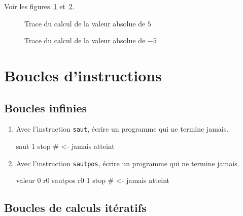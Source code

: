 \begin{correction}
Voir les figures~\ref{fig:abspos} et~\ref{fig:absposmoins}.
  \begin{figure}[tbp]
    \centering
    
    \caption{Trace du calcul de la valeur absolue de $5$}
    \label{fig:abspos}
  \end{figure}
  \begin{figure}[tbp]
    \centering
    
    \caption{Trace du calcul de la valeur absolue de $-5$}
    \label{fig:absposmoins}
  \end{figure}
\clearpage
\end{correction}

\section{Boucles d'instructions}

\subsection{Boucles infinies}

\begin{enumerate}
\item Avec l'instruction \verb|saut|, écrire un programme qui ne
  termine jamais.
\begin{correction}
\begin{listing}{1}
saut 1
stop # <- jamais atteint
\end{listing}
\end{correction}

\item Avec l'instruction \verb|sautpos|, écrire un programme qui ne
  termine jamais.
\begin{correction}
\begin{listing}{1}
valeur 0 r0
sautpos r0 1
stop # <- jamais atteint
\end{listing}  
\end{correction}
\end{enumerate}

\subsection{Boucles de calculs itératifs}

